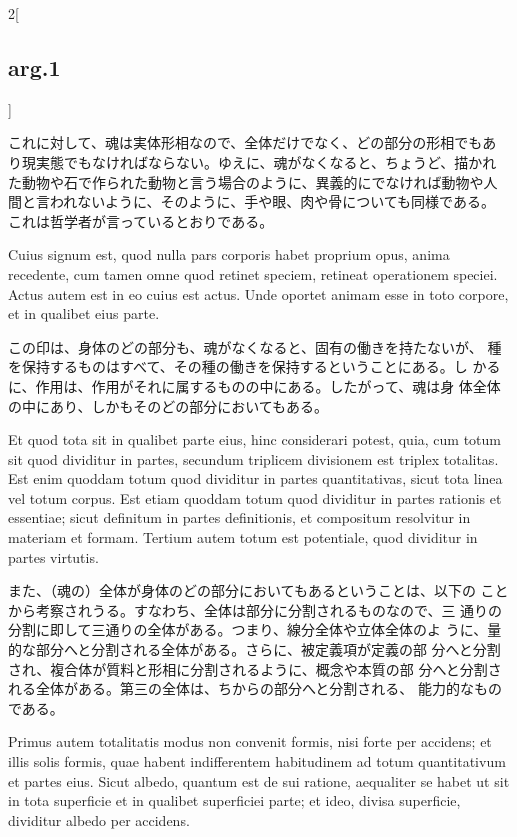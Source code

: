 \documentclass[paper=a4paper,fontsize=10pt,jafontsize=9pt,titlepage]{jlreq}
\begin{document}
\begin{paracol}{2}[\subsection{arg.1}]
\switchcolumn

これに対して、魂は実体形相なので、全体だけでなく、どの部分の形相でもあ
り現実態でもなければならない。ゆえに、魂がなくなると、ちょうど、描かれ
た動物や石で作られた動物と言う場合のように、異義的にでなければ動物や人
間と言われないように、そのように、手や眼、肉や骨についても同様である。
これは哲学者が言っているとおりである。
 
\switchcolumn*


 Cuius signum est, quod nulla pars corporis habet proprium opus, anima
 recedente, cum tamen omne quod retinet speciem, retineat operationem
 speciei. Actus autem est in eo cuius est actus. Unde oportet animam
 esse in toto corpore, et in qualibet eius parte.

\switchcolumn

 この印は、身体のどの部分も、魂がなくなると、固有の働きを持たないが、
 種を保持するものはすべて、その種の働きを保持するということにある。し
 かるに、作用は、作用がそれに属するものの中にある。したがって、魂は身
 体全体の中にあり、しかもそのどの部分においてもある。
 
\switchcolumn*

 Et quod tota sit in qualibet parte eius, hinc considerari potest,
 quia, cum totum sit quod dividitur in partes, secundum triplicem
 divisionem est triplex totalitas. Est enim quoddam totum quod
 dividitur in partes quantitativas, sicut tota linea vel totum
 corpus. Est etiam quoddam totum quod dividitur in partes rationis et
 essentiae; sicut definitum in partes definitionis, et compositum
 resolvitur in materiam et formam. Tertium autem totum est potentiale,
 quod dividitur in partes virtutis.

 \switchcolumn

 また、（魂の）全体が身体のどの部分においてもあるということは、以下の
 ことから考察されうる。すなわち、全体は部分に分割されるものなので、三
 通りの分割に即して三通りの全体がある。つまり、線分全体や立体全体のよ
 うに、量的な部分へと分割される全体がある。さらに、被定義項が定義の部
 分へと分割され、複合体が質料と形相に分割されるように、概念や本質の部
 分へと分割される全体がある。第三の全体は、ちからの部分へと分割される、
 能力的なものである。

\switchcolumn*

 Primus autem totalitatis modus non convenit formis, nisi forte per
 accidens; et illis solis formis, quae habent indifferentem
 habitudinem ad totum quantitativum et partes eius. Sicut albedo,
 quantum est de sui ratione, aequaliter se habet ut sit in tota
 superficie et in qualibet superficiei parte; et ideo, divisa
 superficie, dividitur albedo per accidens.


\end{paracol}
\end{document}
